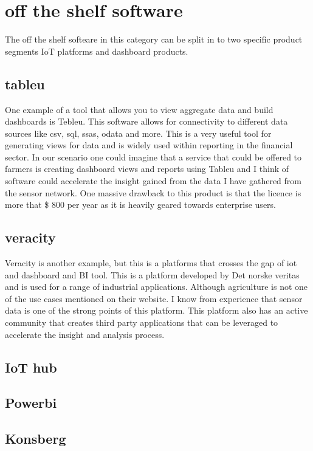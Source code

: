 \documentclass[]{uiophd}
\begin{document}
\section{off the shelf software}
The off the shelf softeare in this category can be split in to two specific product segments IoT platforms and dashboard products.

\subsection{tableu}
One example of a tool that allows you to view aggregate data and build dashboards is Tebleu. This software allows for connectivity to different data sources like csv, sql, ssas, odata and more. This is a very useful tool for generating views for data and is widely used within reporting in the financial sector. In our scenario one could imagine that a service that could be offered to farmers is creating dashboard views and reports using Tableu and I think  of software could accelerate the insight gained from the data I have gathered from the sensor network. One massive drawback to this product is that the licence is more that \$ 800 per year as it is heavily geared towards enterprise users.

\subsection{veracity}
Veracity is another example, but this is a platforms that crosses the gap of iot and dashboard and BI tool. This is a platform developed by Det norske veritas and is used for a range of industrial applications. Although agriculture is not one of the use cases mentioned on their website. I know from experience that sensor data is one of the strong points of this platform. This platform also has an active community that creates third party applications that can be leveraged to accelerate the insight and analysis process. 

\subsection{IoT hub}

\subsection{Powerbi}

\subsection{Konsberg}
\end{document}
